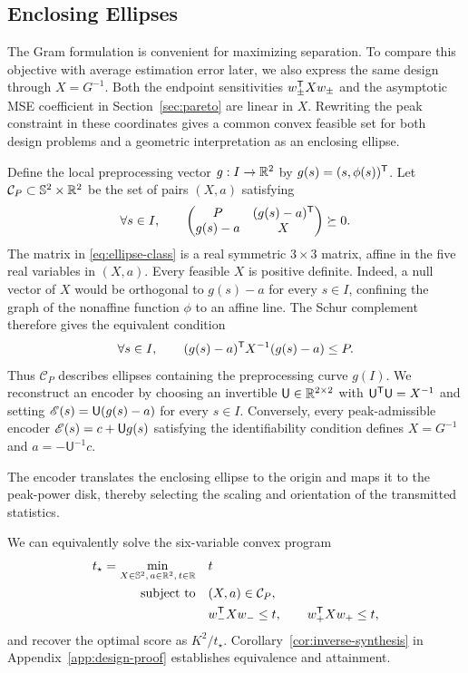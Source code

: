 \subsection{Enclosing Ellipses}
\label{sec:inverse-synthesis}
The Gram formulation is convenient for maximizing separation. To compare this objective with average estimation error later, we also express the same design through $X=G^{-1}$. Both the endpoint sensitivities $w_\pm^\mathsf T Xw_\pm$ and the asymptotic MSE coefficient in Section~\ref{sec:pareto} are linear in $X$. Rewriting the peak constraint in these coordinates gives a common convex feasible set for both design problems and a geometric interpretation as an enclosing ellipse.

Define the local preprocessing vector $g:I\to\mathbb R^2$ by $g(s)=(s,\phi(s))^\mathsf T$. Let $\mathcal C_P\subset\mathbb S^2\times\mathbb R^2$ be the set of pairs $(X,a)$ satisfying
\begin{equation}
 \forall s\in I,\qquad
 \begin{pmatrix}P&(g(s)-a)^\mathsf T\\g(s)-a&X\end{pmatrix}
 \succeq0.
 \label{eq:ellipse-class}
\end{equation}
The matrix in \eqref{eq:ellipse-class} is a real symmetric $3\times3$ matrix, affine in the five real variables in $(X,a)$. Every feasible $X$ is positive definite. Indeed, a null vector of $X$ would be orthogonal to $g(s)-a$ for every $s\in I$, confining the graph of the nonaffine function $\phi$ to an affine line. The Schur complement therefore gives the equivalent condition
$$
 \forall s\in I,\qquad (g(s)-a)^\mathsf T X^{-1}(g(s)-a)\le P.
$$
Thus $\mathcal C_P$ describes ellipses containing the preprocessing curve $g(I)$. We reconstruct an encoder by choosing an invertible $\mathsf U\in\mathbb R^{2\times2}$ with $\mathsf U^\mathsf T\mathsf U=X^{-1}$ and setting $\mathscr E(s)=\mathsf U(g(s)-a)$ for every $s\in I$. Conversely, every peak-admissible encoder $\mathscr E(s)=c+\mathsf U g(s)$ satisfying the identifiability condition defines $X=G^{-1}$ and $a=-\mathsf U^{-1}c$.

The encoder translates the enclosing ellipse to the origin and maps it to the peak-power disk, thereby selecting the scaling and orientation of the transmitted statistics.

We can equivalently solve the six-variable convex program
\begin{equation}
\begin{aligned}
 t_\star=\min_{X\in\mathbb S^2,\,a\in\mathbb R^2,\,t\in\mathbb R}\quad &t\\
 \text{subject to}\quad &(X,a)\in\mathcal C_P,\\
 &w_-^\mathsf T Xw_-\le t,\qquad w_+^\mathsf T Xw_+\le t,
\end{aligned}
 \label{eq:inverse-synthesis}
\end{equation}
and recover the optimal score as $K^2/t_\star$. Corollary~\ref{cor:inverse-synthesis} in Appendix~\ref{app:design-proof} establishes equivalence and attainment.

